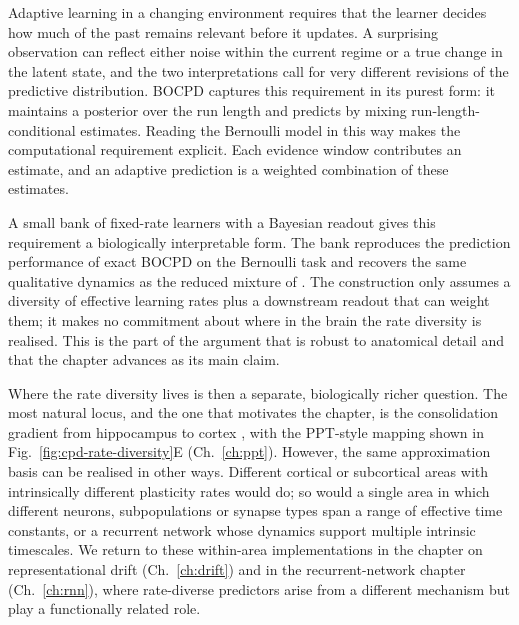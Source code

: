 
Adaptive learning in a changing environment requires that the learner decides how much of the past remains relevant before it updates. A surprising observation can reflect either noise within the current regime or a true change in the latent state, and the two interpretations call for very different revisions of the predictive distribution. BOCPD captures this requirement in its purest form: it maintains a posterior over the run length and predicts by mixing run-length-conditional estimates. Reading the Bernoulli model in this way makes the computational requirement explicit. Each evidence window contributes an estimate, and an adaptive prediction is a weighted combination of these estimates.

A small bank of fixed-rate learners with a Bayesian readout gives this requirement a biologically interpretable form. The bank reproduces the prediction performance of exact BOCPD on the Bernoulli task and recovers the same qualitative dynamics as the reduced mixture of \citet{Wilson2013}. The construction only assumes a diversity of effective learning rates plus a downstream readout that can weight them; it makes no commitment about where in the brain the rate diversity is realised. This is the part of the argument that is robust to anatomical detail and that the chapter advances as its main claim.

Where the rate diversity lives is then a separate, biologically richer question. The most natural locus, and the one that motivates the chapter, is the consolidation gradient from hippocampus to cortex \citep{McClelland1995,Roxin2013}, with the PPT-style mapping shown in Fig.~\ref{fig:cpd-rate-diversity}E (Ch.~\ref{ch:ppt}). However, the same approximation basis can be realised in other ways. Different cortical or subcortical areas with intrinsically different plasticity rates would do; so would a single area in which different neurons, subpopulations or synapse types span a range of effective time constants, or a recurrent network whose dynamics support multiple intrinsic timescales. We return to these within-area implementations in the chapter on representational drift (Ch.~\ref{ch:drift}) and in the recurrent-network chapter (Ch.~\ref{ch:rnn}), where rate-diverse predictors arise from a different mechanism but play a functionally related role.

